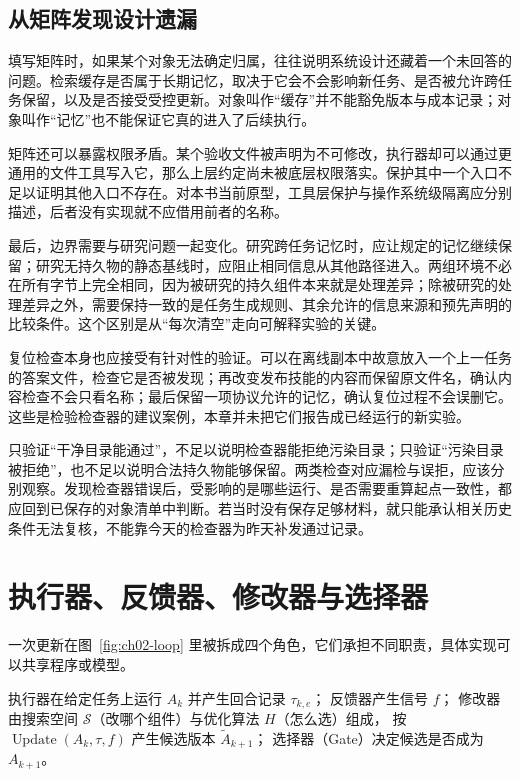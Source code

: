 \subsection{从矩阵发现设计遗漏}

填写矩阵时，如果某个对象无法确定归属，往往说明系统设计还藏着一个未回答的问题。检索缓存是否属于长期记忆，取决于它会不会影响新任务、是否被允许跨任务保留，以及是否接受受控更新。对象叫作“缓存”并不能豁免版本与成本记录；对象叫作“记忆”也不能保证它真的进入了后续执行。

矩阵还可以暴露权限矛盾。某个验收文件被声明为不可修改，执行器却可以通过更通用的文件工具写入它，那么上层约定尚未被底层权限落实。保护其中一个入口不足以证明其他入口不存在。对本书当前原型，工具层保护与操作系统级隔离应分别描述，后者没有实现就不应借用前者的名称。

最后，边界需要与研究问题一起变化。研究跨任务记忆时，应让规定的记忆继续保留；研究无持久物的静态基线时，应阻止相同信息从其他路径进入。两组环境不必在所有字节上完全相同，因为被研究的持久组件本来就是处理差异；除被研究的处理差异之外，需要保持一致的是任务生成规则、其余允许的信息来源和预先声明的比较条件。这个区别是从“每次清空”走向可解释实验的关键。


复位检查本身也应接受有针对性的验证。可以在离线副本中故意放入一个上一任务的答案文件，检查它是否被发现；再改变发布技能的内容而保留原文件名，确认内容检查不会只看名称；最后保留一项协议允许的记忆，确认复位过程不会误删它。这些是检验检查器的建议案例，本章并未把它们报告成已经运行的新实验。

只验证“干净目录能通过”，不足以说明检查器能拒绝污染目录；只验证“污染目录被拒绝”，也不足以说明合法持久物能够保留。两类检查对应漏检与误拒，应该分别观察。发现检查器错误后，受影响的是哪些运行、是否需要重算起点一致性，都应回到已保存的对象清单中判断。若当时没有保存足够材料，就只能承认相关历史条件无法复核，不能靠今天的检查器为昨天补发通过记录。

\section{执行器、反馈器、修改器与选择器}
\label{sec:ch02-roles}

一次更新在图~\ref{fig:ch02-loop} 里被拆成四个角色，它们承担不同职责，具体实现可以共享程序或模型。

\begin{definition}[一次更新的四个角色]
执行器在给定任务上运行 $A_k$ 并产生回合记录 $\tau_{k,e}$；
反馈器产生信号 $f$；
修改器由搜索空间 $\mathcal S$（改哪个组件）与优化算法 $H$（怎么选）组成，
按 $\operatorname{Update}(A_k,\tau,f)$ 产生候选版本 $\widetilde A_{k+1}$；
选择器（Gate）决定候选是否成为 $A_{k+1}$。
\end{definition}

